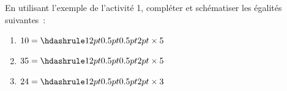 \documentclass[exercice]{thedocument}%
\begin{document}
%
En utilisant l'exemple de l'activité 1, compléter et schématiser les égalités
suivantes~:
\begin{enumerate}
    \item $10=\doted{12pt}\times5$\vskip30pt
    \item $35=\doted{12pt}\times5$\vskip30pt
    \item $24=\doted{12pt}\times3$\vskip30pt
\end{enumerate}
\end{document}
